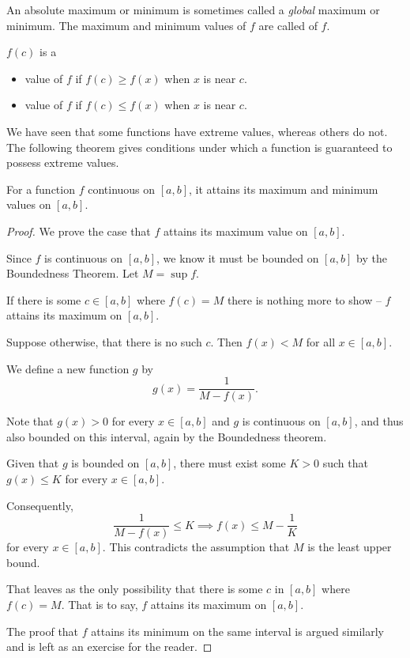 An absolute maximum or minimum is sometimes called a \emph{global} maximum or minimum. The maximum and minimum values of $f$ are called  of $f$.

\begin{definition}
$f(c)$ is a
\begin{itemize}
\item {} value of $f$ if $f(c)\ge f(x)$ when $x$ is near $c$.
\item {} value of $f$ if $f(c)\le f(x)$ when $x$ is near $c$.
\end{itemize}
\end{definition}

We have seen that some functions have extreme values, whereas others do not. The following theorem gives conditions under which a function is guaranteed to possess extreme values.

\begin{theorem}
For a function $f$ continuous on $[a,b]$, it attains its maximum and minimum values on $[a,b]$.
\end{theorem}

\begin{proof}
We prove the case that $f$ attains its maximum value on $[a,b]$.

Since $f$ is continuous on $[a,b]$, we know it must be bounded on $[a,b]$ by the Boundedness Theorem. Let $M = \sup f$.

If there is some $c \in [a,b]$ where $f(c)=M$ there is nothing more to show -- $f$ attains its maximum on $[a,b]$.

Suppose otherwise, that there is no such $c$. Then $f(x)<M$ for all $x \in [a,b]$.

We define a new function $g$ by 
\[ g(x) = \frac{1}{M-f(x)}. \]

Note that $g(x)>0$ for every $x \in [a,b]$ and $g$ is continuous on $[a,b]$, and thus also bounded on this interval, again by the Boundedness theorem.

Given that $g$ is bounded on $[a,b]$, there must exist some $K>0$ such that $g(x) \le K$ for every $x \in [a,b]$.

Consequently,
\[ \frac{1}{M-f(x)} \le K \implies f(x) \le M - \frac{1}{K} \]
for every $x \in [a,b]$. This contradicts the assumption that $M$ is the least upper bound.

That leaves as the only possibility that there is some $c$ in $[a,b]$ where $f(c)=M$. That is to say, $f$ attains its maximum on $[a,b]$.

The proof that $f$ attains its minimum on the same interval is argued similarly and is left as an exercise for the reader.
\end{proof}

